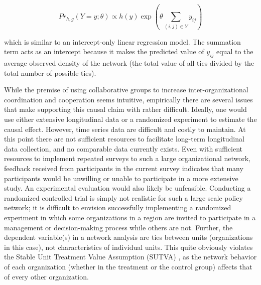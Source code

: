 \documentclass[12pt,a4paper,titlepage]{article}
\begin{document}
\begin{equation}
Pr_{h,g} (Y = y; \theta) \propto h(y) \exp(\theta \sum_{(i,j) \in Y} y_{ij})
\label{eq:Term}
\end{equation}

which is similar to an intercept-only linear regression model. The summation term acts as an intercept because it makes the predicted value of $y_{ij}$ equal to the average observed density of the network (the total value of all ties divided by the total number of possible ties).

While the premise of using collaborative groups to increase inter-organizational coordination and cooperation seems intuitive, empirically there are several issues that make supporting this causal claim with rather difficult. Ideally, one would use either extensive longitudinal data or a randomized experiment to estimate the causal effect. However, time series data are difficult and costly to maintain. At this point there are not sufficient resources to facilitate long-term longitudinal data collection, and no comparable data currently exists. Even with sufficient resources to implement repeated surveys to such a large organizational network, feedback received from participants in the current survey indicates that many participants would be unwilling or unable to participate in a more extensive study. An experimental evaluation would also likely be unfeasible. Conducting a randomized controlled trial is simply not realistic for such a large scale policy network; it is difficult to envision successfully implementing a randomized experiment in which some organizations in a region are invited to participate in a management or decision-making process while others are not. Further, the dependent variable(s) in a network analysis are ties between units (organizations in this case), not characteristics of individual units. This quite obviously violates the Stable Unit Treatment Value Assumption (SUTVA) \parencite{rubin1986, pearl2000}, as the network behavior of each organization (whether in the treatment or the control group) affects that of every other organization.
\end{document}
